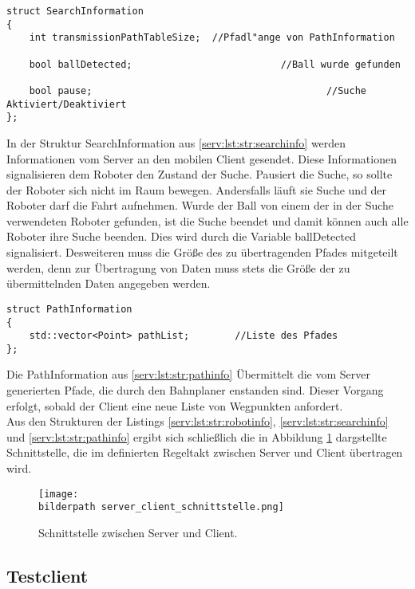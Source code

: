 \begin{lstlisting}[frame=tb,captionpos=b,caption={Datenstruktur  SearchInformation.}, label=serv:lst:str:searchinfo]
struct SearchInformation
{
	int transmissionPathTableSize;	//Pfadl"ange von PathInformation

	bool ballDetected;							//Ball wurde gefunden
	
	bool pause;											//Suche Aktiviert/Deaktiviert
};
\end{lstlisting}

In der Struktur SearchInformation aus \ref{serv:lst:str:searchinfo} werden Informationen vom Server an den mobilen Client gesendet. Diese Informationen signalisieren dem Roboter den Zustand der Suche. Pausiert die Suche, so sollte der Roboter sich nicht im Raum bewegen. Andersfalls läuft sie Suche und der Roboter darf die Fahrt aufnehmen. Wurde der Ball von einem der in der Suche verwendeten Roboter gefunden, ist die Suche beendet und damit können auch alle Roboter ihre Suche beenden. Dies wird durch die Variable ballDetected signalisiert. Desweiteren muss die Größe des zu übertragenden Pfades mitgeteilt werden, denn zur Übertragung von Daten muss stets die Größe der zu übermittelnden Daten angegeben werden.

\begin{lstlisting}[frame=tb,captionpos=b,caption=Datenstruktur PathInformation., label=serv:lst:str:pathinfo]
struct PathInformation
{
	std::vector<Point> pathList;		//Liste des Pfades
};
\end{lstlisting}

Die PathInformation aus \ref{serv:lst:str:pathinfo} Übermittelt die vom Server generierten Pfade, die durch den Bahnplaner enstanden sind. Dieser Vorgang erfolgt, sobald der Client eine neue Liste von Wegpunkten anfordert. \\

Aus den Strukturen der Listings \ref{serv:lst:str:robotinfo}, \ref{serv:lst:str:searchinfo} und \ref{serv:lst:str:pathinfo} ergibt sich schließlich die in Abbildung \ref{serv:fig:schnittstelle} dargstellte Schnittstelle, die im  definierten Regeltakt zwischen Server und Client übertragen wird.

\begin{figure}[h]
	\centering	
	\texttt{[image: \\bilderpath server\_client\_schnittstelle.png]}
	\caption{Schnittstelle zwischen Server und Client.}
	\label{serv:fig:schnittstelle}
\end{figure}

\subsection{Testclient}\label{serv:testclient}

